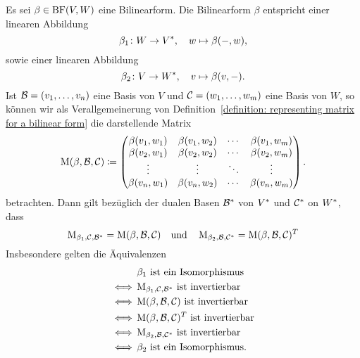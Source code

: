 Es sei $\beta \in \operatorname{BF}(V, W)$ eine Bilinearform.
Die Bilinearform $\beta$ entspricht einer linearen Abbildung
\[
          \beta_1
  \colon  W
  \to     V^*,
  \quad
          w
  \mapsto \beta(-,w),
\]
sowie einer linearen Abbildung
\[
          \beta_2
  \colon  V
  \to     W^*,
  \quad
          v
  \mapsto \beta(v,-).
\]
Ist $\mathcal{B} = (v_1, \dotsc, v_n)$ eine Basis von $V$ und $\mathcal{C} = (w_1, \dotsc, w_m)$ eine Basis von $W$, so können wir als Verallgemeinerung von Definition~\ref{definition: representing matrix for a bilinear form} die darstellende Matrix
\[
            \operatorname{M}(\beta, \mathcal{B}, \mathcal{C})
  \coloneqq \begin{pmatrix}
              \beta(v_1, w_1) & \beta(v_1, w_2) & \cdots  & \beta(v_1, w_m) \\
              \beta(v_2, w_1) & \beta(v_2, w_2) & \cdots  & \beta(v_2, w_m) \\
              \vdots          & \vdots          & \ddots  & \vdots          \\
              \beta(v_n, w_1) & \beta(v_n, w_2) & \cdots  & \beta(v_n, w_m)
            \end{pmatrix}.
\]
betrachten.
Dann gilt bezüglich der dualen Basen $\mathcal{B}^*$ von $V^*$ und $\mathcal{C}^*$ on $W^*$, dass
\[
    \operatorname{M}_{\beta_1, \mathcal{C}, \mathcal{B}^*}
  = \operatorname{M}(\beta, \mathcal{B}, \mathcal{C})
  \quad\text{und}\quad
    \operatorname{M}_{\beta_2, \mathcal{B}, \mathcal{C}^*}
  = \operatorname{M}(\beta, \mathcal{B}, \mathcal{C}) ^T
\]
Insbesondere gelten die Äquivalenzen
\begin{align*}
      &\, \text{$\beta_1$ ist ein Isomorphismus}                                                \\
  \iff&\, \text{$\operatorname{M}_{\beta_1, \mathcal{C}, \mathcal{B}^*}$ ist invertierbar}         \\
  \iff&\, \text{$\operatorname{M}(\beta, \mathcal{B}, \mathcal{C})$ ist invertierbar}               \\
  \iff&\, \text{$\operatorname{M}(\beta, \mathcal{B}, \mathcal{C}) ^T$ ist invertierbar} \\
  \iff&\, \text{$\operatorname{M}_{\beta_2, \mathcal{B}, \mathcal{C}^*}$ ist invertierbar}         \\
  \iff&\, \text{$\beta_2$ ist ein Isomorphismus}.
\end{align*}

